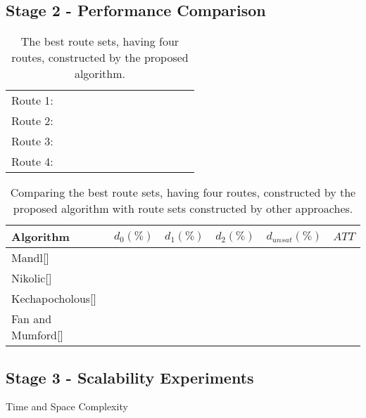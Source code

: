 \subsection{Stage 2 - Performance Comparison}

\begin{table}[H]
	\centering
    \begin{tabular}{|l|l l l l l l l l|}
    \hline
    Route 1: & ~ & ~ & ~ & ~ & ~ & ~ & ~ & ~ \\
    Route 2: & ~ & ~ & ~ & ~ & ~ & ~ & ~ & ~ \\
    Route 3: & ~ & ~ & ~ & ~ & ~ & ~ & ~ & ~ \\
    Route 4: & ~ & ~ & ~ & ~ & ~ & ~ & ~ & ~ \\
	\hline
    \end{tabular}
    \caption {The best route sets, having four routes, constructed by the proposed algorithm.}
    \label{table:performanceComparison_bestRouteSet4}
	\end{table}

\begin{table}[H]
	\centering
    \begin{tabular}{|l||l|l|l|l|l|}
 	\hline
 	Algorithm & $d_0(\%)$ & $d_1(\%)$ & $d_2(\%)$ & $d_{unsat}(\%)$ & $ATT$ \\
 	\hline
    Mandl[] & ~ & ~ & ~ & ~ & ~ \\
    Nikolic[] & ~ & ~ & ~ & ~ & ~ \\
    Kechapocholous[] & ~ & ~ & ~ & ~ & ~ \\
    Fan and Mumford[] & ~ & ~ & ~ & ~ & ~ \\
   
	\hline
    \end{tabular}
    \caption {Comparing the best route sets, having four routes, constructed by the proposed algorithm with route sets constructed by other approaches.}
    \label{table:performanceComparison_4}
	\end{table}

\subsection{Stage 3 -  Scalability Experiments}
Time and Space Complexity